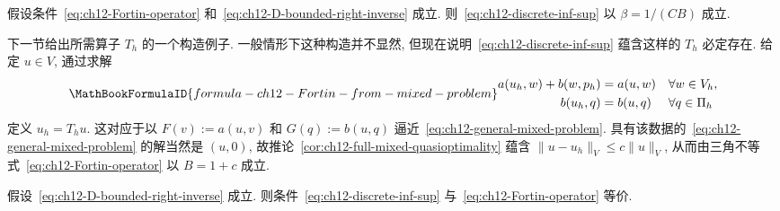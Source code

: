 \begin{Lemma}
\label{lem:ch12-Fortin-sufficient}
假设条件~\eqref{eq:ch12-Fortin-operator} 和~\eqref{eq:ch12-D-bounded-right-inverse} 成立. 则~\eqref{eq:ch12-discrete-inf-sup} 以 $\beta=1/(CB)$ 成立.
\end{Lemma}

下一节给出所需算子 $T_h$ 的一个构造例子. 一般情形下这种构造并不显然, 但现在说明~\eqref{eq:ch12-discrete-inf-sup} 蕴含这样的 $T_h$ 必定存在. 给定 $u\in V$, 通过求解
\[
\MathBookFormulaID{formula-ch12-Fortin-from-mixed-problem}
\begin{aligned}
a(u_h,w)+b(w,p_h)&=a(u,w)&&\forall w\in V_h,\\
b(u_h,q)&=b(u,q)&&\forall q\in\Pi_h
\end{aligned}
\]
定义 $u_h=T_hu$. 这对应于以 $F(v):=a(u,v)$ 和 $G(q):=b(u,q)$ 逼近~\eqref{eq:ch12-general-mixed-problem}. 具有该数据的~\eqref{eq:ch12-general-mixed-problem} 的解当然是 $(u,0)$, 故推论~\ref{cor:ch12-full-mixed-quasioptimality} 蕴含
$\|u-u_h\|_V\leq c\|u\|_V$, 从而由三角不等式~\eqref{eq:ch12-Fortin-operator} 以 $B=1+c$ 成立.

\begin{Theorem}
\label{thm:ch12-inf-sup-Fortin-equivalence}
假设~\eqref{eq:ch12-D-bounded-right-inverse} 成立. 则条件~\eqref{eq:ch12-discrete-inf-sup} 与~\eqref{eq:ch12-Fortin-operator} 等价.
\end{Theorem}
